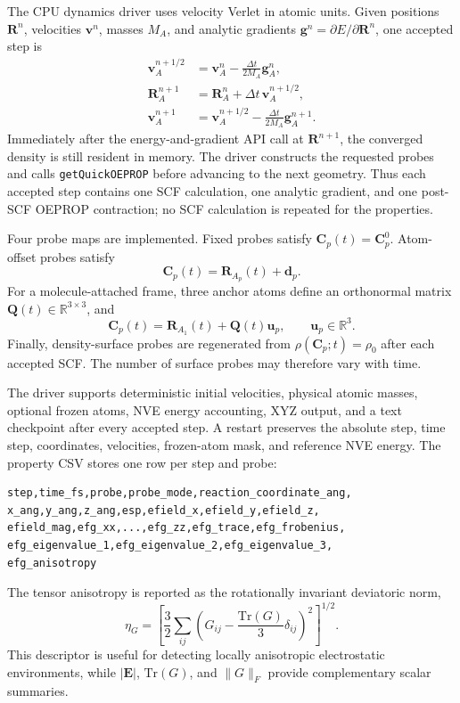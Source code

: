 \documentclass[journal=jctcce,manuscript=article,email=false]{achemso}
\newcommand{\keyword}[1]{\texttt{#1}}
\begin{document}
The CPU dynamics driver uses velocity Verlet in atomic units.  Given
positions \(\mathbf{R}^{n}\), velocities \(\mathbf{v}^{n}\), masses
\(M_A\), and analytic gradients
\(\mathbf{g}^{n}=\partial E/\partial\mathbf{R}^{n}\), one accepted step is
\begin{align}
 \mathbf{v}^{n+1/2}_A
 &=\mathbf{v}^{n}_A-\frac{\Delta t}{2M_A}\mathbf{g}^{n}_A,\\
 \mathbf{R}^{n+1}_A
 &=\mathbf{R}^{n}_A+\Delta t\,\mathbf{v}^{n+1/2}_A,\\
 \mathbf{v}^{n+1}_A
 &=\mathbf{v}^{n+1/2}_A-\frac{\Delta t}{2M_A}\mathbf{g}^{n+1}_A.
 \label{eq:velocity_verlet}
\end{align}
Immediately after the energy-and-gradient API call at
\(\mathbf{R}^{n+1}\), the converged density is still resident in memory.
The driver constructs the requested probes and calls
\keyword{getQuickOEPROP} before advancing to the next geometry.  Thus each
accepted step contains one SCF calculation, one analytic gradient, and one
post-SCF OEPROP contraction; no SCF calculation is repeated for the
properties.

Four probe maps are implemented.  Fixed probes satisfy
\(\mathbf{C}_p(t)=\mathbf{C}_p^0\).  Atom-offset probes satisfy
\begin{equation}
 \mathbf{C}_p(t)=\mathbf{R}_{A_p}(t)+\mathbf{d}_p.
\end{equation}
For a molecule-attached frame, three anchor atoms define an orthonormal
matrix \(\mathbf{Q}(t)\in\mathbb{R}^{3\times3}\), and
\begin{equation}
 \mathbf{C}_p(t)=\mathbf{R}_{A_1}(t)+\mathbf{Q}(t)\mathbf{u}_p,
 \qquad \mathbf{u}_p\in\mathbb{R}^{3}.
 \label{eq:body_probe}
\end{equation}
Finally, density-surface probes are regenerated from
\(\rho(\mathbf{C}_p;t)=\rho_0\) after each accepted SCF.  The number of
surface probes may therefore vary with time.

The driver supports deterministic initial velocities, physical atomic
masses, optional frozen atoms, NVE energy accounting, XYZ output, and a
text checkpoint after every accepted step.  A restart preserves the
absolute step, time step, coordinates, velocities, frozen-atom mask, and
reference NVE energy.  The property CSV stores one row per step and probe:
\begin{verbatim}
step,time_fs,probe,probe_mode,reaction_coordinate_ang,
x_ang,y_ang,z_ang,esp,efield_x,efield_y,efield_z,
efield_mag,efg_xx,...,efg_zz,efg_trace,efg_frobenius,
efg_eigenvalue_1,efg_eigenvalue_2,efg_eigenvalue_3,
efg_anisotropy
\end{verbatim}
The tensor anisotropy is reported as the rotationally invariant deviatoric
norm,
\begin{equation}
  \eta_G =
  \left[
    \frac{3}{2}
    \sum_{ij}
    \left(G_{ij}-\frac{\mathrm{Tr}(G)}{3}\delta_{ij}\right)^2
  \right]^{1/2}.
  \label{eq:anisotropy}
\end{equation}
This descriptor is useful for detecting locally anisotropic electrostatic
environments, while \(|\mathbf{E}|\), \(\mathrm{Tr}(G)\), and
\(\|G\|_F\) provide complementary scalar summaries.
\end{document}
